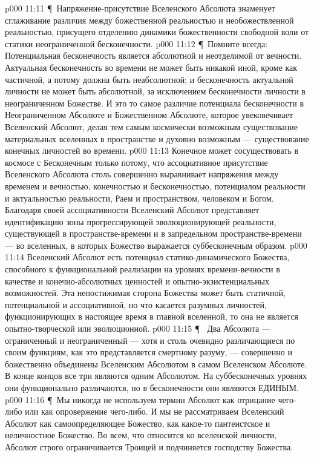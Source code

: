 \vs p000 11:11 \P\ Напряжение\hyp{}присутствие Вселенского Абсолюта знаменует сглаживание различия между божественной реальностью и необожествленной реальностью, присущего отделению динамики божественности свободной воли от статики неограниченной бесконечности.
\vs p000 11:12 \P\ Помните всегда: Потенциальная бесконечность является абсолютной и неотделимой от вечности. Актуальная бесконечность во времени не может быть никакой иной, кроме как частичной, а потому должна быть неабсолютной; и бесконечность актуальной личности не может быть абсолютной, за исключением бесконечности личности в неограниченном Божестве. И это то самое различие потенциала бесконечности в Неограниченном Абсолюте и Божественном Абсолюте, которое увековечивает Вселенский Абсолют, делая тем самым космически возможным существование материальных вселенных в пространстве и духовно возможным --- существование конечных личностей во времени.
\vs p000 11:13 Конечное может сосуществовать в космосе с Бесконечным только потому, что ассоциативное присутствие Вселенского Абсолюта столь совершенно выравнивает напряжения между временем и вечностью, конечностью и бесконечностью, потенциалом реальности и актуальностью реальности, Раем и пространством, человеком и Богом. Благодаря своей ассоциативности Вселенский Абсолют представляет идентификацию зоны прогрессирующей эволюционирующей реальности, существующей в пространстве\hyp{}времени и в запредельном пространстве\hyp{}времени --- во вселенных, в которых Божество выражается суббесконечным образом.
\vs p000 11:14 Вселенский Абсолют есть потенциал статико\hyp{}динамического Божества, способного к функциональной реализации на уровнях времени\hyp{}вечности в качестве и конечно\hyp{}абсолютных ценностей и опытно\hyp{}экзистенциальных возможностей. Эта непостижимая сторона Божества может быть статичной, потенциальной и ассоциативной, но что касается разумных личностей, функционирующих в настоящее время в главной вселенной, то она не является опытно\hyp{}творческой или эволюционной.
\vs p000 11:15 \P\  Два Абсолюта --- ограниченный и неограниченный --- хотя и столь очевидно различающиеся по своим функциям, как это представляется смертному разуму, --- совершенно и божественно объединены Вселенским Абсолютом в самом Вселенском Абсолюте. В конце концов все три являются одним Абсолютом. На суббесконечных уровнях они функционально различаются, но в бесконечности они являются ЕДИНЫМ.
\vs p000 11:16 \P\ Мы никогда не используем термин Абсолют как отрицание чего\hyp{}либо или как опровержение чего\hyp{}либо. И мы не рассматриваем Вселенский Абсолют как самоопределяющее Божество, как какое\hyp{}то пантеистское и неличностное Божество. Во всем, что относится ко вселенской личности, Абсолют строго ограничивается Троицей и подчиняется господству Божества.
